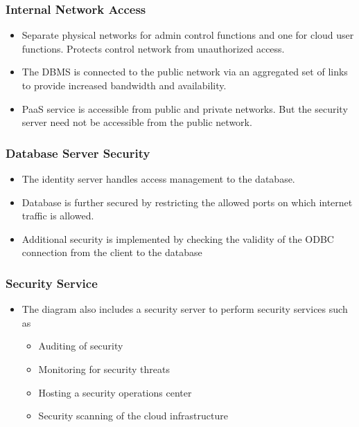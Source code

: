 \documentclass{article}
\begin{document}
\subsubsection{Internal Network Access}
\begin{itemize}
    \item Separate physical networks for admin control functions and one for cloud user functions. Protects control network from unauthorized access.
    
    \item The DBMS is connected to the public network via an aggregated set of links to provide increased bandwidth and availability.
    
    \item PaaS service is accessible from public and private networks. But the security server need not be accessible from the public network.
\end{itemize}

\subsubsection{Database Server Security}
\begin{itemize}
    \item The identity server handles access management to the database. 
    
    \item Database is further secured by restricting the allowed ports on which internet traffic is allowed. 
    
    \item Additional security is implemented by checking the validity of the ODBC connection from the client to the database
\end{itemize}

\subsubsection{Security Service}
\begin{itemize}
    \item The diagram also includes a security server to perform security services such as
    
    \begin{itemize}
        \item Auditing of security
        
        \item Monitoring for security threats
        
        \item Hosting a security operations center
        
        \item Security scanning of the cloud infrastructure
    \end{itemize} 
\end{itemize}
\end{document}
